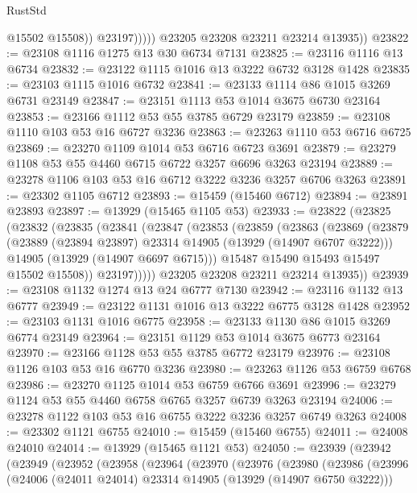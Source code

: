 \begin{lexlean}{RustStd}
\begin{coremodule}
                      @15502
                      @15508))
                  @23197)))))
        @23205
        @23208
        @23211
        @23214
        @13935))
@23822 := @23108 @1116 @1275 @13 @30 @6734 @7131
@23825 := @23116 @1116 @13 @6734
@23832 := @23122 @1115 @1016 @13 @3222 @6732 @3128 @1428
@23835 := @23103 @1115 @1016 @6732
@23841 := @23133 @1114 @86 @1015 @3269 @6731 @23149
@23847 := @23151 @1113 @53 @1014 @3675 @6730 @23164
@23853 := @23166 @1112 @53 @55 @3785 @6729 @23179
@23859 := @23108 @1110 @103 @53 @16 @6727 @3236
@23863 := @23263 @1110 @53 @6716 @6725
@23869 := @23270 @1109 @1014 @53 @6716 @6723 @3691
@23879 := @23279 @1108 @53 @55 @4460 @6715 @6722 @3257 @6696 @3263 @23194
@23889 := @23278 @1106 @103 @53 @16 @6712 @3222 @3236 @3257 @6706 @3263
@23891 := @23302 @1105 @6712
@23893 := @15459 (@15460 @6712)
@23894 := @23891 @23893
@23897 := @13929 (@15465 @1105 @53)
@23933 := @23822
    (@23825
      (@23832
        (@23835
          (@23841
            (@23847
              (@23853
                (@23859
                  (@23863
                    (@23869
                      (@23879
                        (@23889 (@23894 @23897) @23314 @14905 (@13929 (@14907 @6707 @3222)))
                        @14905
                        (@13929 (@14907 @6697 @6715)))
                      @15487
                      @15490
                      @15493
                      @15497
                      @15502
                      @15508))
                  @23197)))))
        @23205
        @23208
        @23211
        @23214
        @13935))
@23939 := @23108 @1132 @1274 @13 @24 @6777 @7130
@23942 := @23116 @1132 @13 @6777
@23949 := @23122 @1131 @1016 @13 @3222 @6775 @3128 @1428
@23952 := @23103 @1131 @1016 @6775
@23958 := @23133 @1130 @86 @1015 @3269 @6774 @23149
@23964 := @23151 @1129 @53 @1014 @3675 @6773 @23164
@23970 := @23166 @1128 @53 @55 @3785 @6772 @23179
@23976 := @23108 @1126 @103 @53 @16 @6770 @3236
@23980 := @23263 @1126 @53 @6759 @6768
@23986 := @23270 @1125 @1014 @53 @6759 @6766 @3691
@23996 := @23279 @1124 @53 @55 @4460 @6758 @6765 @3257 @6739 @3263 @23194
@24006 := @23278 @1122 @103 @53 @16 @6755 @3222 @3236 @3257 @6749 @3263
@24008 := @23302 @1121 @6755
@24010 := @15459 (@15460 @6755)
@24011 := @24008 @24010
@24014 := @13929 (@15465 @1121 @53)
@24050 := @23939
    (@23942
      (@23949
        (@23952
          (@23958
            (@23964
              (@23970
                (@23976
                  (@23980
                    (@23986
                      (@23996
                        (@24006 (@24011 @24014) @23314 @14905 (@13929 (@14907 @6750 @3222)))

\end{coremodule}
\end{lexlean}
